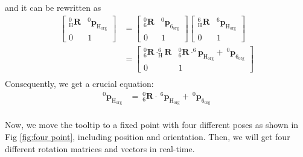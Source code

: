 and it can be rewritten as
\begin{equation}
\begin{split}																												
\begin{bmatrix}
_{\mathrm{H}}^{\mathrm{0}}\mathbf{R} & ^\mathrm{0}\!\boldsymbol{p}_\mathrm{H_{org}}\\ 
0 & 1
\end{bmatrix} &=
\begin{bmatrix}
_{\mathrm{6}}^{\mathrm{0}}\mathbf{R} & ^\mathrm{0}\!\boldsymbol{p}_\mathrm{6_{org}}\\ 
0 & 1
\end{bmatrix}
\begin{bmatrix}
_{\mathrm{H}}^{\mathrm{6}}\mathbf{R} & ^\mathrm{6}\!\boldsymbol{p}_\mathrm{H_{org}}\\ 
0 & 1
\end{bmatrix}\\
&= 
\begin{bmatrix}
_{\mathrm{6}}^{\mathrm{0}}\mathbf{R} \cdot _{\mathrm{H}}^{\mathrm{6}}\!\mathbf{R} & _{\mathrm{6}}^{\mathrm{0}}\mathbf{R} \cdot ^\mathrm{6}\!\!\boldsymbol{p}_\mathrm{H_{org}} +\ ^\mathrm{0}\!\boldsymbol{p}_\mathrm{6_{org}}\\ 
0 & 1
\end{bmatrix}\\
\end{split}
\end{equation}
Consequently, we get a crucial equation:
\begin{equation}
\begin{split}
^\mathrm{0}\!\boldsymbol{p}_\mathrm{H_{org}} &=\  _{\mathrm{6}}^{\mathrm{0}}\mathbf{R}\cdot\ ^\mathrm{6}\!\boldsymbol{p}_\mathrm{H_{org}} +\ ^\mathrm{0}\!\boldsymbol{p}_\mathrm{6_{org}}\\
\end{split}
\end{equation}
\par
Now, we move the tooltip to a fixed point with four different poses as shown in Fig \ref{fig:four point}, including position and orientation. Then, we will get four different rotation matrices and vectors in real-time. 
